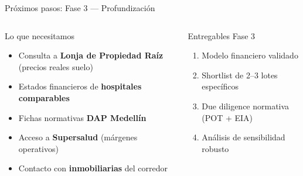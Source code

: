 \documentclass[aspectratio=169, 11pt]{beamer}
\begin{document}
\begin{frame}{Próximos pasos: Fase 3 — Profundización}
\begin{columns}[T]
\begin{alertblock}{\small Lo que necesitamos}
\small
\begin{itemize}\footnotesize
  \item[\textcolor{coral}{$\blacktriangledown$}] Consulta a \textbf{Lonja de Propiedad Raíz} (precios reales suelo)
  \item[\textcolor{coral}{$\blacktriangledown$}] Estados financieros de \textbf{hospitales comparables}
  \item[\textcolor{coral}{$\blacktriangledown$}] Fichas normativas \textbf{DAP Medellín}
  \item[\textcolor{amber}{$\blacktriangledown$}] Acceso a \textbf{Supersalud} (márgenes operativos)
  \item[\textcolor{amber}{$\blacktriangledown$}] Contacto con \textbf{inmobiliarias} del corredor
\end{itemize}
\end{alertblock}

\vspace{6pt}
\begin{block}{\small Entregables Fase 3}
\small
\begin{enumerate}\footnotesize
  \item Modelo financiero validado
  \item Shortlist de 2--3 lotes específicos
  \item Due diligence normativa (POT + EIA)
  \item Análisis de sensibilidad robusto
\end{enumerate}
\end{block}
\end{columns}
\end{frame}
\end{document}
